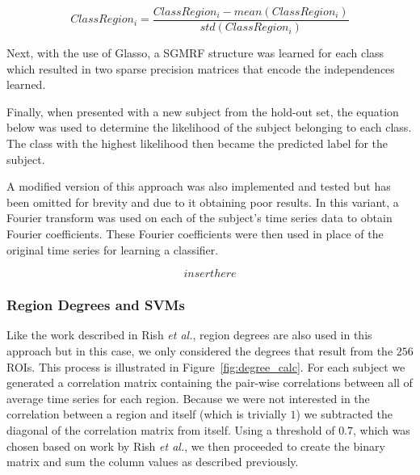 \documentclass{article} %
\begin{document}
\begin{equation}
ClassRegion_i = \frac{ClassRegion_i - mean(ClassRegion_i)}{std(ClassRegion_i)}
\end{equation}

Next, with the use of Glasso, a SGMRF structure was learned for each class 
which resulted in two sparse precision matrices that encode the independences
learned. 

Finally, when presented with a new subject from the hold-out set, the equation
below was used to determine the likelihood of the subject belonging to each
class. The class with the highest likelihood then became the predicted label
for the subject.

A modified version of this approach was also implemented and tested but has
been omitted for brevity and due to it obtaining poor results. In this variant,
a Fourier transform was used on each of the subject's time series data to 
obtain Fourier coefficients. These Fourier coefficients were then used in 
place of the original time series for learning a classifier.

\begin{equation}
insert here
\end{equation}


\subsubsection{Region Degrees and SVMs}

Like the work described in Rish \emph{et al.}, region degrees are also used in
this approach but in this case, we only considered the degrees that result from
the $256$ ROIs. This process is illustrated in Figure~\ref{fig:degree_calc}. For each subject 
we generated a correlation matrix containing the pair-wise correlations between 
all of average time series for each region. Because we were not 
interested in the correlation between a region and itself (which is trivially 
$1$) we subtracted the diagonal of the correlation matrix from itself. Using a
threshold of $0.7$, which was chosen based on work by Rish \emph{et al.}, we
then proceeded to create the binary matrix and sum the column values as 
described previously.
\end{document}
